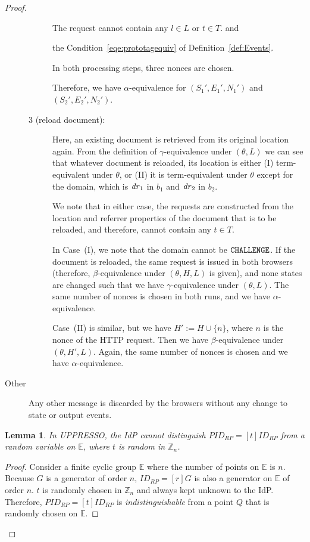 \documentclass[letterpaper,onecolumn,10pt]{article}
\newtheorem{lemma}{Lemma}
\begin{document}
\begin{proof}
\begin{description}
\begin{description}
      The request cannot contain any $l \in L$ or $t \in T$.
      and 
      
      the Condition~\ref{eqe:prototagequiv} of 
      Definition~\ref{def:Events}.

      In both processing steps, three nonces are chosen.

      Therefore, we have $\alpha$-equivalence for $(S_1',E_1',N_1')$
      and $(S_2',E_2',N_2')$.
      \item[3 (reload document):]
      Here, an existing document is
      retrieved from its original location again. From the definition
      of $\gamma$-equivalence under $(\theta,L)$ we can see that
      whatever document is reloaded, its location is either (I)
      term-equivalent under $\theta$, or (II) it is term-equivalent
      under $\theta$ except for the domain, which is $\mathit{dr}_1$ in
      $b_1$ and $\mathit{dr}_2$ in $b_2$. 

      We note that in either case, the requests are constructed from
      the location and referrer properties of the document that is to
      be reloaded, and therefore, cannot contain any $t\in T$.

      In Case~(I), we note that the domain cannot be
      $\mathtt{CHALLENGE}$. If the document is reloaded, the same 
      request is issued in both browsers (therefore,
      $\beta$-equivalence under $(\theta, H, L)$ is given), and 
      none states are changed such that we have
      $\gamma$-equivalence under $(\theta, L)$. The same number of
      nonces is chosen in both runs, and we have
      $\alpha$-equivalence.

      Case~(II) is similar, but we have $H' := H \cup \{n\}$, where
      $n$ is the nonce of the HTTP request. 
      Then we have $\beta$-equivalence under
      $(\theta,H',L)$. Again, the same number of nonces is chosen and
      we have $\alpha$-equivalence. 
      \end{description}
    \item[Other] Any other message is discarded by the browsers 
      without any change to state or output events.
  \end{description}

  \begin{lemma}\label{thm-idp-untraceability}
    In UPPRESSO, the IdP cannot distinguish 
    $PID_{RP} = [t]ID_{RP}$ from a random variable on 
    $\mathbb{E}$, where $t$ is random in $\mathbb{Z}_n$.
  \end{lemma}
  \begin{proof}
    Consider a finite cyclic group $\mathbb{E}$ where the 
    number of points on $\mathbb{E}$ is $n$. Because $G$ is a 
    generator of order $n$, $ID_{RP} = [r]G$ is also a 
    generator on $\mathbb{E}$ of order $n$. $t$ is randomly 
    chosen in $\mathbb{Z}_n$ and always kept unknown to the 
    IdP. Therefore, $PID_{RP} = [t]ID_{RP}$ is 
    \emph{indistinguishable} from a point $Q$ that is randomly 
    chosen on $\mathbb{E}$.
  \end{proof}


\end{proof}
\end{document}
